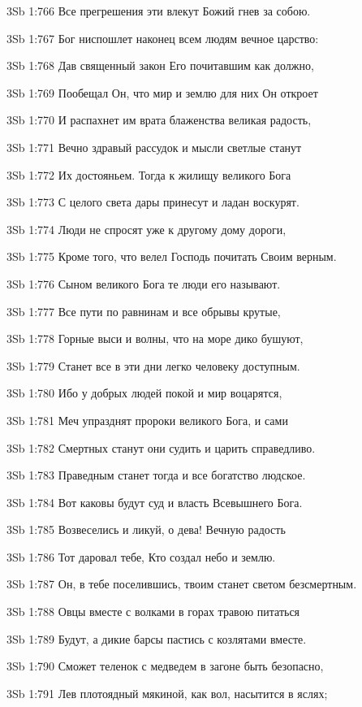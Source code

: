 \vs 3Sb 1:766 Все прегрешения эти влекут Божий гнев за собою.

\vs 3Sb 1:767 Бог ниспошлет наконец всем людям вечное царство: 

\vs 3Sb 1:768 Дав священный закон Его почитавшим как должно, 

\vs 3Sb 1:769 Пообещал Он, что мир и землю для них Он откроет 

\vs 3Sb 1:770 И распахнет им врата блаженства  великая радость, 

\vs 3Sb 1:771 Вечно здравый рассудок и мысли светлые станут 

\vs 3Sb 1:772 Их достояньем. Тогда к жилищу великого Бога

\vs 3Sb 1:773 С целого света дары принесут и ладан воскурят. 

\vs 3Sb 1:774 Люди не спросят уже к другому дому дороги,

\vs 3Sb 1:775 Кроме того, что велел Господь почитать Своим верным. 

\vs 3Sb 1:776 Сыном великого Бога те люди его называют.

\vs 3Sb 1:777 Все пути по равнинам и все обрывы крутые, 

\vs 3Sb 1:778 Горные выси и волны, что на море дико бушуют,  

\vs 3Sb 1:779 Станет все в эти дни легко человеку доступным.

\vs 3Sb 1:780 Ибо у добрых людей покой и мир воцарятся, 

\vs 3Sb 1:781 Меч упразднят пророки великого Бога, и сами 

\vs 3Sb 1:782 Смертных станут они судить и царить справедливо. 

\vs 3Sb 1:783 Праведным станет тогда и все богатство людское. 

\vs 3Sb 1:784 Вот каковы будут суд и власть Всевышнего Бога.

\vs 3Sb 1:785 Возвеселись и ликуй, о дева! Вечную радость 

\vs 3Sb 1:786 Тот даровал тебе, Кто создал небо и землю. 

\vs 3Sb 1:787 Он, в тебе поселившись, твоим станет светом безсмертным. 

\vs 3Sb 1:788 Овцы вместе с волками в горах травою питаться 

\vs 3Sb 1:789 Будут, а дикие барсы  пастись с козлятами вместе.

\vs 3Sb 1:790 Сможет теленок с медведем в загоне быть безопасно, 

\vs 3Sb 1:791 Лев плотоядный мякиной, как вол, насытится в яслях; 

